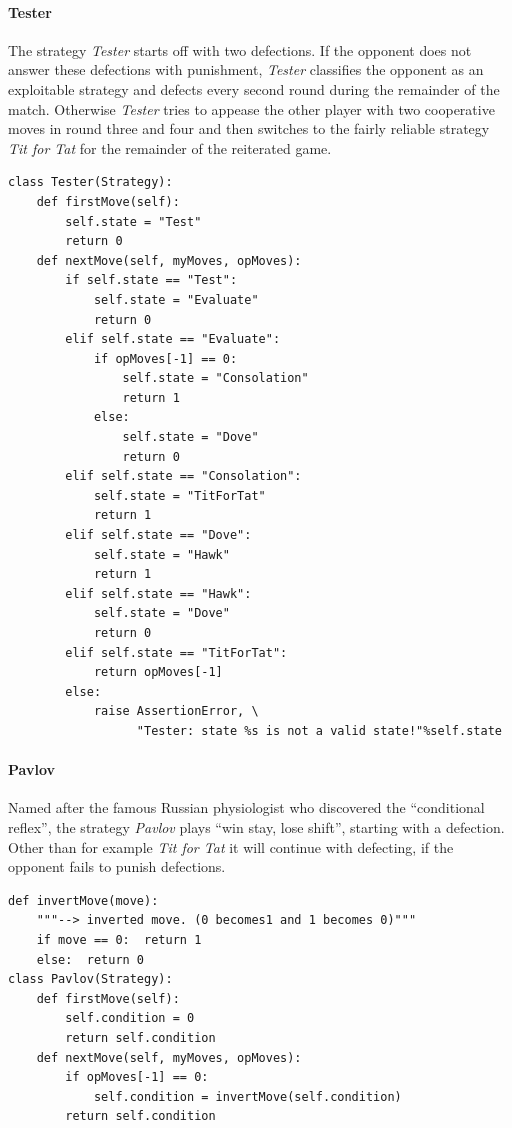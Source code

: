 \paragraph{Tester} The strategy
{\em Tester} starts off with two defections. If the opponent does not answer
these defections with punishment, {\em Tester}
classifies the opponent as an exploitable strategy and defects every second
round during the remainder of the match. Otherwise {\em Tester} tries
to appease the other player with two cooperative moves in round three and
four and then switches to the fairly reliable strategy {\em Tit for Tat} for
the remainder of the reiterated game.
\begin{scriptsize}
\begin{verbatim}
class Tester(Strategy):
    def firstMove(self):
        self.state = "Test"
        return 0
    def nextMove(self, myMoves, opMoves):
        if self.state == "Test":
            self.state = "Evaluate"
            return 0
        elif self.state == "Evaluate":
            if opMoves[-1] == 0:
                self.state = "Consolation"
                return 1
            else:
                self.state = "Dove"
                return 0
        elif self.state == "Consolation":
            self.state = "TitForTat"
            return 1
        elif self.state == "Dove":
            self.state = "Hawk"
            return 1
        elif self.state == "Hawk":
            self.state = "Dove"
            return 0
        elif self.state == "TitForTat":
            return opMoves[-1]
        else:
            raise AssertionError, \
                  "Tester: state %s is not a valid state!"%self.state
\end{verbatim}
\end{scriptsize}

\paragraph{Pavlov} Named after the famous Russian physiologist who discovered
the ``conditional reflex'', the strategy {\em Pavlov} plays ``win stay, lose
shift'', starting with a defection. Other than for example {\em Tit for Tat} it
will continue with defecting, if the opponent fails to punish defections.
\begin{scriptsize}
\begin{verbatim}
def invertMove(move):
    """--> inverted move. (0 becomes1 and 1 becomes 0)"""
    if move == 0:  return 1
    else:  return 0
class Pavlov(Strategy):
    def firstMove(self):
        self.condition = 0
        return self.condition
    def nextMove(self, myMoves, opMoves):
        if opMoves[-1] == 0:
            self.condition = invertMove(self.condition)
        return self.condition
\end{verbatim}
\end{scriptsize}

